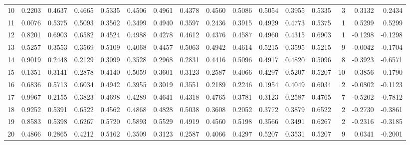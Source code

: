\begin{tabular}{lrrrrrrrrrrrrrrr}
10  &      0.2203 &  0.4637 &  0.4665 &  0.5335 &  0.4506 &  0.4961 &  0.4378 &  0.4560 &  0.5086 &  0.5054 &   0.3955 &     0.5335 &      3 &                    0.3132 &                     0.2434 \\
11  &      0.0076 &  0.5375 &  0.5093 &  0.3562 &  0.3499 &  0.4940 &  0.3597 &  0.2436 &  0.3915 &  0.4929 &   0.4773 &     0.5375 &      1 &                    0.5299 &                     0.5299 \\
12  &      0.8201 &  0.6903 &  0.6582 &  0.4524 &  0.4988 &  0.4278 &  0.4612 &  0.4376 &  0.4587 &  0.4960 &   0.4315 &     0.6903 &      1 &                   -0.1298 &                    -0.1298 \\
13  &      0.5257 &  0.3553 &  0.3569 &  0.5109 &  0.4068 &  0.4457 &  0.5063 &  0.4942 &  0.4614 &  0.5215 &   0.3595 &     0.5215 &      9 &                   -0.0042 &                    -0.1704 \\
14  &      0.9019 &  0.2448 &  0.2129 &  0.3099 &  0.3528 &  0.2968 &  0.2831 &  0.4416 &  0.5096 &  0.4917 &   0.4820 &     0.5096 &      8 &                   -0.3923 &                    -0.6571 \\
15  &      0.1351 &  0.3141 &  0.2878 &  0.4140 &  0.5059 &  0.3601 &  0.3123 &  0.2587 &  0.4066 &  0.4297 &   0.5207 &     0.5207 &     10 &                    0.3856 &                     0.1790 \\
16  &      0.6836 &  0.5713 &  0.6034 &  0.4942 &  0.3955 &  0.3019 &  0.3551 &  0.2189 &  0.2246 &  0.1954 &   0.4049 &     0.6034 &      2 &                   -0.0802 &                    -0.1123 \\
17  &      0.9967 &  0.2155 &  0.3823 &  0.4698 &  0.4289 &  0.4641 &  0.4318 &  0.4765 &  0.3781 &  0.3123 &   0.2587 &     0.4765 &      7 &                   -0.5202 &                    -0.7812 \\
18  &      0.9252 &  0.5391 &  0.6522 &  0.4562 &  0.4868 &  0.4828 &  0.5038 &  0.3608 &  0.2052 &  0.3772 &   0.3879 &     0.6522 &      2 &                   -0.2730 &                    -0.3861 \\
19  &      0.8583 &  0.5398 &  0.6267 &  0.5720 &  0.5893 &  0.5529 &  0.4919 &  0.4560 &  0.5198 &  0.3566 &   0.3491 &     0.6267 &      2 &                   -0.2316 &                    -0.3185 \\
20  &      0.4866 &  0.2865 &  0.4212 &  0.5162 &  0.3509 &  0.3123 &  0.2587 &  0.4066 &  0.4297 &  0.5207 &   0.3531 &     0.5207 &      9 &                    0.0341 &                    -0.2001 \\

\end{tabular}
